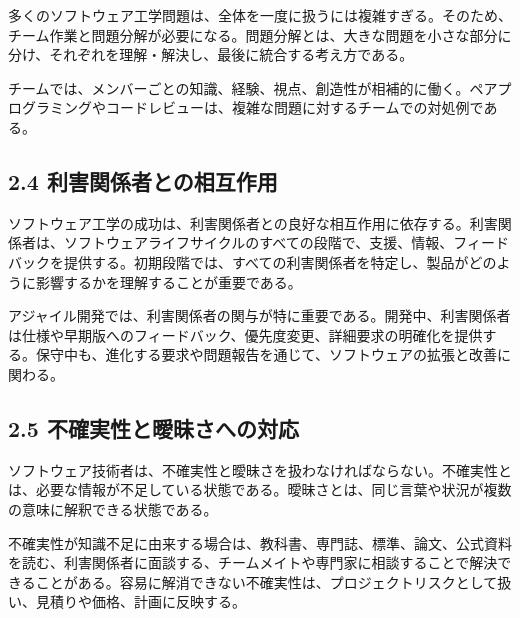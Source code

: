 \documentclass[uplatex,dvipdfmx,a4paper,11pt]{jsarticle}
\begin{document}

多くのソフトウェア工学問題は、全体を一度に扱うには複雑すぎる。そのため、チーム作業と問題分解が必要になる。問題分解とは、大きな問題を小さな部分に分け、それぞれを理解・解決し、最後に統合する考え方である。

チームでは、メンバーごとの知識、経験、視点、創造性が相補的に働く。ペアプログラミングやコードレビューは、複雑な問題に対するチームでの対処例である。

\subsection*{2.4 利害関係者との相互作用}


ソフトウェア工学の成功は、利害関係者との良好な相互作用に依存する。利害関係者は、ソフトウェアライフサイクルのすべての段階で、支援、情報、フィードバックを提供する。初期段階では、すべての利害関係者を特定し、製品がどのように影響するかを理解することが重要である。

アジャイル開発では、利害関係者の関与が特に重要である。開発中、利害関係者は仕様や早期版へのフィードバック、優先度変更、詳細要求の明確化を提供する。保守中も、進化する要求や問題報告を通じて、ソフトウェアの拡張と改善に関わる。

\begin{center}
\end{center}

\subsection*{2.5 不確実性と曖昧さへの対応}


ソフトウェア技術者は、不確実性と曖昧さを扱わなければならない。不確実性とは、必要な情報が不足している状態である。曖昧さとは、同じ言葉や状況が複数の意味に解釈できる状態である。

不確実性が知識不足に由来する場合は、教科書、専門誌、標準、論文、公式資料を読む、利害関係者に面談する、チームメイトや専門家に相談することで解決できることがある。容易に解消できない不確実性は、プロジェクトリスクとして扱い、見積りや価格、計画に反映する。
\end{document}
